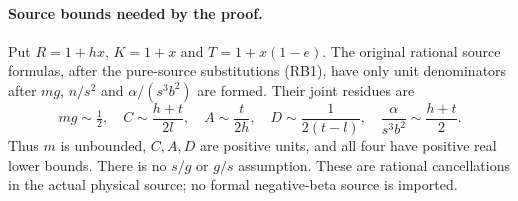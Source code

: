 \paragraph{Source bounds needed by the proof.}
Put $R=1+hx$, $K=1+x$ and $T=1+x(1-e)$. The original rational source
formulas, after the pure-source substitutions (RB1), have only unit
denominators after $mg$, $n/s^2$ and $\alpha/(s^3b^2)$ are formed.
Their joint residues are
\[
 mg\sim\tfrac12,\quad
 C\sim\frac{h+t}{2l},\quad A\sim\frac t{2h},\quad
 D\sim\frac1{2(t-l)},\quad
 \frac\alpha{s^3b^2}\sim\frac{h+t}2.               \tag{RB4}
\]
Thus $m$ is unbounded, $C,A,D$ are positive units, and all four have
positive real lower bounds. There is no $s/g$ or $g/s$ assumption.
These are rational cancellations in the actual physical source;
no formal negative-beta source is imported.

